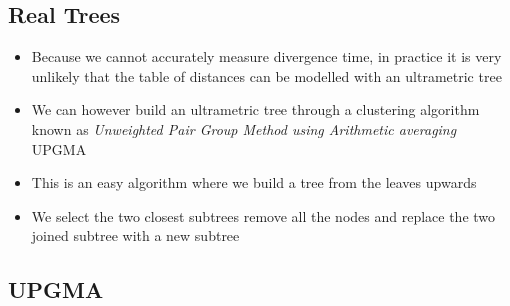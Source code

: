 
\begin{slide}
\section{Real Trees}

\begin{PauseHighLight}
  \begin{itemize}
  \item Because we cannot accurately measure divergence time, in practice
    it is very unlikely that the table of distances can be modelled with
    an ultrametric tree\pause
  \item We can however build an ultrametric tree through a clustering
    algorithm known as \emph{Unweighted Pair Group Method using
      Arithmetic averaging} UPGMA\pause
  \item This is an easy algorithm where we build a tree from the leaves
    upwards\pause
  \item We select the two closest subtrees remove all the nodes and
    replace the two joined subtree with a new subtree\pause
  \end{itemize}
\end{PauseHighLight}

\end{slide}


\begin{slide}
\section{UPGMA}
\pause
\pb
{}
\begin{center}
  \pause
\end{center}
\end{slide}


